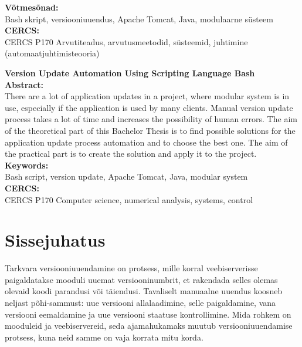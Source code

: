 \documentclass[12pt]{article}
\renewcommand{\headrulewidth}{0pt}
\begin{document}
  \noindent\textbf{Võtmesõnad:}\\
  Bash skript, versiooniuuendus, Apache Tomcat, Java, modulaarne süsteem\\
  
  \noindent\textbf{CERCS:}\\
  CERCS P170 Arvutiteadus, arvutusmeetodid, süsteemid, juhtimine (automaatjuhtimisteooria)
  \vspace{2cm}

  \noindent\textbf{Version Update Automation Using Scripting Language Bash}\\

  \noindent\textbf{Abstract:}\\
  There are a lot of application updates in a project, where modular system is in use, especially if the application is used by many clients. Manual version update process takes a lot of time and increases the possibility of human errors. The aim of the theoretical part of this Bachelor Thesis is to find possible solutions for the application update process automation and to choose the best one. The aim of the practical part is to create the solution and apply it to the project.\\

  \noindent\textbf{Keywords:}\\
  Bash script, version update, Apache Tomcat, Java, modular system\\
  
  \noindent\textbf{CERCS:}\\
  CERCS P170 Computer science, numerical analysis, systems, control
  
  \newpage
 
  \tableofcontents
  \fancypagestyle{plain}{%
    \renewcommand{\headrulewidth}{0pt}%
    \fancyhf{}%
    \fancyfoot[R]{\thepage}%
  }
 
  \newpage
  
  \section*{Sissejuhatus}
  \label{sissejuhatus}
  
  Tarkvara versiooniuuendamine on protsess, mille korral veebiserverisse paigaldatakse mooduli uuemat versiooninumbrit, et rakendada selles olemas olevaid koodi parandusi või täiendusi. Tavaliselt manuaalne uuendus koosneb neljast põhi\--sammust: uue versiooni allalaadimine, selle paigaldamine, vana versiooni eemaldamine ja uue versiooni staatuse kontrollimine. Mida rohkem on mooduleid ja veebiservereid, seda ajamahukamaks muutub versiooniuuendamise protsess, kuna neid samme on vaja korrata mitu korda.
  
\end{document}
